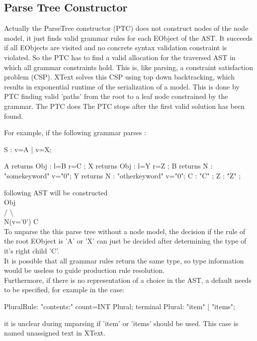 \subsection{Parse Tree Constructor}  \label{xtxt:ptc}
Actually the ParseTree constructor (PTC) does not construct nodes of the node model, it just finds valid grammar rules for each EObject of the AST. It succeeds if all EObjects are visited and no concrete syntax validation constraint is violated. So the PTC has to find a valid allocation for the traversed AST in which all grammar constraints hold.  This is, like parsing, a constraint satisfaction problem (CSP). XText solves this CSP  using top down backtracking, which results in exponential runtime of the serialization of a model. This is done by PTC finding valid 'paths' from the root to a leaf node constrained by the grammar. The PTC does The PTC stops after the first valid solution has been found. 

For example, if the following grammar parses :
\begin{xtxt}
S  	:  	v=A 
	| 	v=X;

A returns Obj	: 	l=B r=C   ;
X returns Obj	: 	l=Y r=Z   ;
B returns N  	:  	"somekeyword" 	v="0";
Y returns N  	: 	"otherkeyword" 	v="0";
C 		:  	 "C" ;
Z 		: 	 "Z" ;
\end{xtxt}
following AST will be constructed  \\ 
      Obj			\\
     /   \textbackslash		\\
N(v='0')   C	\\
To unparse the this parse tree without a node model, the decision if the rule of the root EObject is 'A' or 'X' can just be decided after determining the type of it's right child 'C'. \\

It is possible that all grammar rules return the same type, so type information would be useless to guide production rule resolution.\\
Furthermore, if there is no representation of a choice in the AST, a default needs to be specified, for example in the case: 
\begin{xtxt}
PluralRule: "contents:" count=INT Plural;
terminal Plural: "item" | "items";
\end{xtxt}
it is unclear during unparsing if 'item' or 'items' should be used. This case is named unassigned text in XText.

